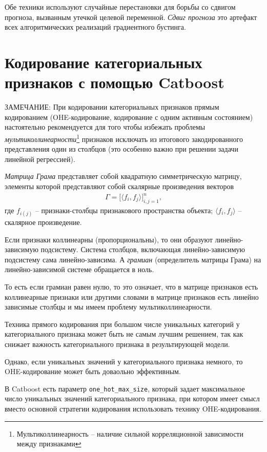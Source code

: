 \documentclass[%
	11pt,
	a4paper,
	utf8,
		]{article}
\begin{document}
Обе техники используют случайные перестановки для борьбы со сдвигом прогноза, вызванным утечкой целевой переменной. \emph{Сдвиг прогноза} это артефакт всех алгоритмических реализаций градиентного бустинга.

\section{Кодирование категориальных признаков с помощью Catboost}

ЗАМЕЧАНИЕ: При кодировании категориальных признаков прямым кодированием (OHE-кодирование, кодирование с одним активным состоянием) настоятельно рекомендуется для того чтобы избежать проблемы \emph{мультиколлинеарности}\footnote{Мультиколлинеарность -- наличие сильной корреляционной зависимости между признаками} признаков исключать из итогового закодированного представления один из столбцов (это особенно важно при решении задачи линейной регрессией).

\emph{Матрица Грама} представляет собой квадратную симметрическую матрицу, элементы которой представляют собой скалярные произведения векторов
\begin{align*}
	\Gamma = \big[ \langle f_i, f_j \rangle \big]_{i,j=1}^n,
\end{align*}
где $f_{i(j)}$ -- признаки-столбцы признакового пространства объекта; $ \langle f_i, f_j \rangle $ -- скалярное произведение.

Если признаки коллинеарны (пропорциональны), то они образуют линейно-зависимую подсистему. Система столбцов, включающая линейно-зависимую подсистему сама линейно-зависима. А \emph{грамиан} (определитель матрицы Грама) на линейно-зависимой системе обращается в ноль. 

То есть если грамиан равен нулю, то это означает, что в матрице признаков есть коллинеарные признаки или другими словами в матрице признаков есть линейно зависимые столбцы и мы имеем проблему мультиколлинеарности.

Техника прямого кодирования при большом числе уникальных категорий у категориального признака может быть не самым лучшим решением, так как снижает важность категориального признака в результирующей модели.

Однако, если уникальных значений у категориального признака немного, то OHE-кодирование может быть доваольно эффективным.

В Catboost есть параметр \texttt{one\_hot\_max\_size}, который задает максимальное число уникальных значений категориального признака, при котором имеет смысл вместо основной стратегии кодирования использовать технику OHE-кодирования.
\end{document}
